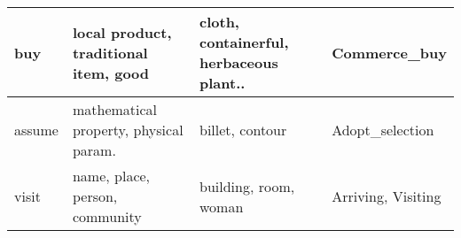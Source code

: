 \begin{table*}[th]
\begin{tabular}{|l|l|l|l|}
buy&local product, traditional item, good&cloth, containerful, herbaceous plant..&Commerce\_buy\\ \hline
assume&mathematical property, physical param. &billet, contour&Adopt\_selection\\ \hline
visit&name, place, person, community&building, room, woman&Arriving, Visiting\\ \hline

\end{tabular}
\end{table*}
